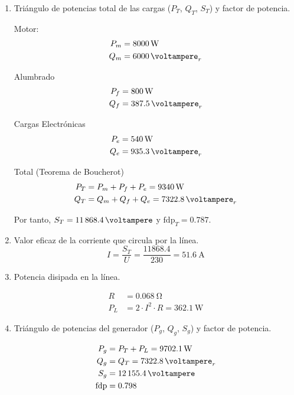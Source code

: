 \begin{enumerate}
\item Triángulo de potencias total de las cargas ($P_T$, $Q_T$, $S_T$) y factor de potencia.

    Motor:
  \begin{align*}
    P_m &= \SI{8000}{\watt}\\
    Q_m &= \SI{6000}{\voltampere}_r\\
  \end{align*}

  Alumbrado
  \begin{align*}
    P_f &= \SI{800}{\watt}\\
    Q_f &= \SI{387.5}{\voltampere}_r\\
  \end{align*}

  Cargas Electrónicas
  \begin{align*}
    P_e &= \SI{540}{\watt}\\
    Q_e &= \SI{935.3}{\voltampere}_r\\
  \end{align*}

  Total (Teorema de Boucherot)
  \begin{align*}
    P_T &= P_m + P_f + P_e = \SI{9340}{\watt}\\
    Q_T &= Q_m + Q_f + Q_e = \SI{7322.8}{\voltampere}_r\\
  \end{align*}

  Por tanto, $S_T = \SI{11868.4}{\voltampere}$ y
  $\mathrm{fdp}_T = 0.787$.

\item Valor eficaz de la corriente que circula por la línea.
\[
  I = \frac{S_T}{U} = \frac{11868.4}{230} = \SI{51.6}{\ampere}
\]

\item Potencia disipada en la línea.

  \begin{align*}
  R &= \SI{0.068}{\ohm}\\
  P_L &= 2 \cdot I^2 \cdot R = \SI{362.1}{\watt}
  \end{align*}

\item Triángulo de potencias del generador ($P_g$, $Q_g$, $S_g$) y factor de potencia.


  \begin{align*}
    P_g &= P_T + P_L = \SI{9702.1}{\watt}\\
    Q_g &= Q_T = \SI{7322.8}{\voltampere}_r\\
    S_g &= \SI{12155.4}{\voltampere}\\    
    \mathrm{fdp} &= 0.798
  \end{align*}


\end{enumerate}
